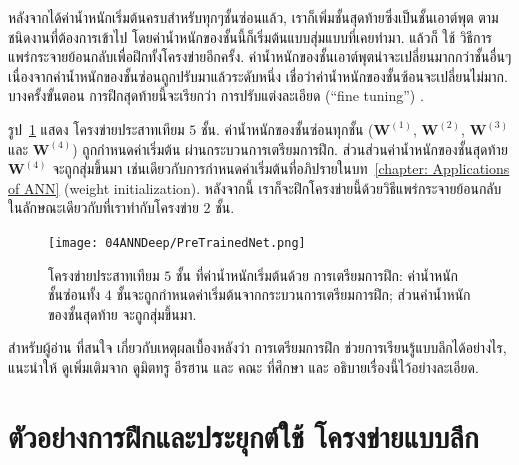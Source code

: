 หลังจากได้ค่าน้ำหนักเริ่มต้นครบสำหรับทุกๆชั้นซ่อนแล้ว, เราก็เพิ่มชั้นสุดท้ายซึ่งเป็นชั้นเอาต์พุต ตามชนิดงานที่ต้องการเข้าไป โดยค่าน้ำหนักของชั้นนี้ก็เริ่มต้นแบบสุ่มแบบที่เคยทำมา.
แล้วก็ ใช้ วิธีการแพร่กระจายย้อนกลับเพื่อฝึกทั้งโครงข่ายอีกครั้ง.
ค่าน้ำหนักของชั้นเอาต์พุตน่าจะเปลี่ยนมากกว่าชั้นอื่นๆ เนื่องจากค่าน้ำหนักของชั้นซ่อนถูกปรับมาแล้วระดับหนึ่ง เชื่อว่าค่าน้ำหนักของชั้นซ้อนจะเปลี่ยนไม่มาก.
บางครั้งขั้นตอน การฝึกสุดท้ายนี้จะเรียกว่า การปรับแต่งละเอียด (``fine tuning'') .

รูป~\ref{fig: deep pre-trained network} แสดง โครงข่ายประสาทเทียม $5$ ชั้น.
ค่าน้ำหนักของชั้นซ่อนทุกชั้น ($\mathbf{W}^{(1)}$, $\mathbf{W}^{(2)}$, $\mathbf{W}^{(3)}$ และ $\mathbf{W}^{(4)}$) ถูกกำหนดค่าเริ่มต้น ผ่านกระบวนการเตรียมการฝึก.
ส่วนส่วนค่าน้ำหนักของชั้นสุดท้าย $\mathbf{W}^{(4)}$ จะถูกสุ่มขึ้นมา เช่นเดียวกับการกำหนดค่าเริ่มต้นที่อภิปรายในบท~\ref{chapter: Applications of ANN} (weight initialization).
หลังจากนี้ เราก็จะฝึกโครงข่ายนี้ด้วยวิธีแพร่กระจายย้อนกลับ ในลักษณะเดียวกับที่เราทำกับโครงข่าย $2$ ชั้น.

%
\begin{figure}
\begin{center}
\texttt{[image: 04ANNDeep/PreTrainedNet.png]}
\end{center}
\caption{โครงข่ายประสาทเทียม $5$ ชั้น ที่ค่าน้ำหนักเริ่มต้นด้วย การเตรียมการฝึก: 
ค่าน้ำหนักชั้นซ่อนทั้ง $4$ ชั้นจะถูกกำหนดค่าเริ่มต้นจากกระบวนการเตรียมการฝึก;
ส่วนค่าน้ำหนักของชั้นสุดท้าย จะถูกสุ่มขึ้นมา.}
\label{fig: deep pre-trained network}
\end{figure}
%

สำหรับผู้อ่าน ที่สนใจ เกี่ยวกับเหตุผลเบื้องหลังว่า การเตรียมการฝึก ช่วยการเรียนรู้แบบลึกได้อย่างไร, แนะนำให้ ดูเพิ่มเติมจาก ดูมิตทรู อีรฮาน และ คณะ \cite{ErhanEtAl2010a} ที่ศึกษา และ อธิบายเรื่องนี้ไว้อย่างละเอียด.

\section{ตัวอย่างการฝึกและประยุกต์ใช้ โครงข่ายแบบลึก}
\label{deep: deep learning}

